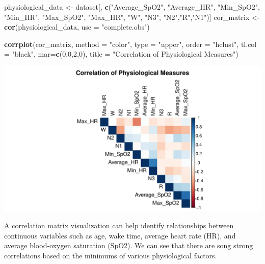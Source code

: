 \documentclass[
]{article}
\newenvironment{Shaded}{\begin{snugshade}}{\end{snugshade}}
\newcommand{\AttributeTok}[1]{\textcolor[rgb]{0.13,0.29,0.53}{#1}}
\newcommand{\DecValTok}[1]{\textcolor[rgb]{0.00,0.00,0.81}{#1}}
\newcommand{\FunctionTok}[1]{\textcolor[rgb]{0.13,0.29,0.53}{\textbf{#1}}}
\newcommand{\NormalTok}[1]{#1}
\newcommand{\OtherTok}[1]{\textcolor[rgb]{0.56,0.35,0.01}{#1}}
\newcommand{\StringTok}[1]{\textcolor[rgb]{0.31,0.60,0.02}{#1}}
\begin{document}
\begin{Shaded}
\begin{Highlighting}[]
\NormalTok{physiological\_data }\OtherTok{\textless{}{-}}\NormalTok{ dataset[, }\FunctionTok{c}\NormalTok{(}\StringTok{"Average\_SpO2"}\NormalTok{, }\StringTok{"Average\_HR"}\NormalTok{, }\StringTok{"Min\_SpO2"}\NormalTok{,}
                                  \StringTok{"Min\_HR"}\NormalTok{, }\StringTok{"Max\_SpO2"}\NormalTok{, }\StringTok{"Max\_HR"}\NormalTok{, }\StringTok{"W"}\NormalTok{, }\StringTok{"N3"}\NormalTok{,}
                                  \StringTok{"N2"}\NormalTok{,}\StringTok{"R"}\NormalTok{,}\StringTok{"N1"}\NormalTok{)]}
\NormalTok{cor\_matrix }\OtherTok{\textless{}{-}} \FunctionTok{cor}\NormalTok{(physiological\_data, }\AttributeTok{use =} \StringTok{"complete.obs"}\NormalTok{)}

\FunctionTok{corrplot}\NormalTok{(cor\_matrix, }\AttributeTok{method =} \StringTok{"color"}\NormalTok{, }\AttributeTok{type =} \StringTok{"upper"}\NormalTok{, }\AttributeTok{order =} \StringTok{"hclust"}\NormalTok{,}
         \AttributeTok{tl.col =} \StringTok{"black"}\NormalTok{, }\AttributeTok{mar=}\FunctionTok{c}\NormalTok{(}\DecValTok{0}\NormalTok{,}\DecValTok{0}\NormalTok{,}\DecValTok{2}\NormalTok{,}\DecValTok{0}\NormalTok{),}
         \AttributeTok{title =} \StringTok{"Correlation of Physiological Measures"}\NormalTok{)}
\end{Highlighting}
\end{Shaded}

\includegraphics{602_project_files/figure-latex/unnamed-chunk-14-1.pdf}

A correlation matrix visualization can help identify relationships
between continuous variables such as age, wake time, average heart rate
(HR), and average blood-oxygen saturation (SpO2). We can see that there
are song strong correlations based on the minimums of various
physiological factors.
\end{document}
